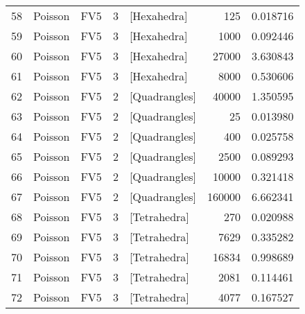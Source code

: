 \begin{tabular}{lllrlrr}
58 &   Poisson &                   FV5 &               3 &    [Hexahedra] &                      125 &                         0.018716 \\
59 &   Poisson &                   FV5 &               3 &    [Hexahedra] &                     1000 &                         0.092446 \\
60 &   Poisson &                   FV5 &               3 &    [Hexahedra] &                    27000 &                         3.630843 \\
61 &   Poisson &                   FV5 &               3 &    [Hexahedra] &                     8000 &                         0.530606 \\
62 &   Poisson &                   FV5 &               2 &  [Quadrangles] &                    40000 &                         1.350595 \\
63 &   Poisson &                   FV5 &               2 &  [Quadrangles] &                       25 &                         0.013980 \\
64 &   Poisson &                   FV5 &               2 &  [Quadrangles] &                      400 &                         0.025758 \\
65 &   Poisson &                   FV5 &               2 &  [Quadrangles] &                     2500 &                         0.089293 \\
66 &   Poisson &                   FV5 &               2 &  [Quadrangles] &                    10000 &                         0.321418 \\
67 &   Poisson &                   FV5 &               2 &  [Quadrangles] &                   160000 &                         6.662341 \\
68 &   Poisson &                   FV5 &               3 &   [Tetrahedra] &                      270 &                         0.020988 \\
69 &   Poisson &                   FV5 &               3 &   [Tetrahedra] &                     7629 &                         0.335282 \\
70 &   Poisson &                   FV5 &               3 &   [Tetrahedra] &                    16834 &                         0.998689 \\
71 &   Poisson &                   FV5 &               3 &   [Tetrahedra] &                     2081 &                         0.114461 \\
72 &   Poisson &                   FV5 &               3 &   [Tetrahedra] &                     4077 &                         0.167527 \\
\bottomrule
\end{tabular}
